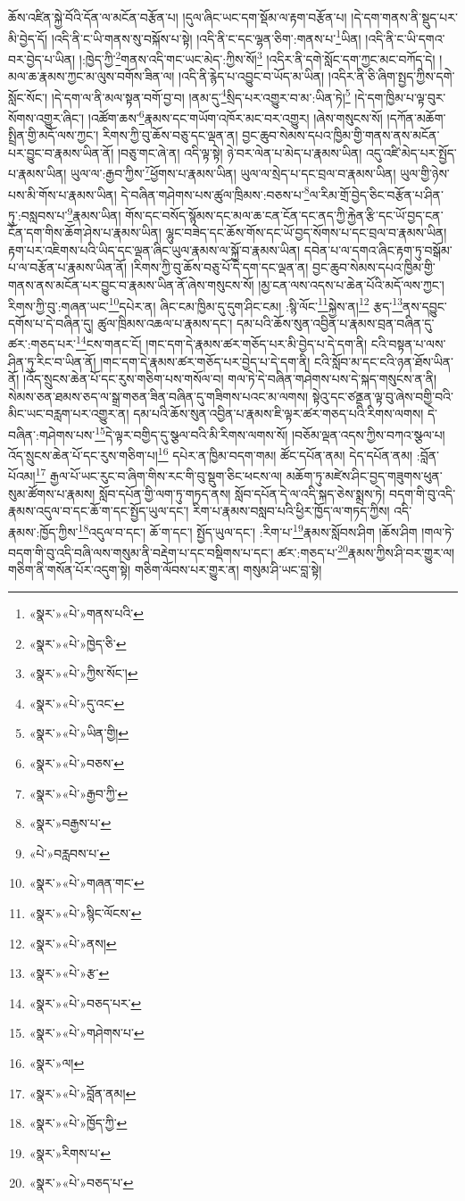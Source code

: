ཆོས་འཛིན་སྐྱེ་བོའི་དོན་ལ་མངོན་བརྩོན་པ། །དུལ་ཞིང་ཡང་དག་སྡོམ་ལ་རྟག་བརྩོན་པ། །དེ་དག་གནས་ནི་སྡུད་པར་མི་བྱེད་དོ། །འདི་ནི་ང་ཡི་གནས་སུ་བསྐོས་པ་སྟེ། །འདི་ནི་ང་དང་ལྷན་ཅིག་:གནས་པ་\footnote{«སྣར་»«པེ་»གནས་པའི་}ཡིན། །འདི་ནི་ང་ཡི་དགའ་བར་བྱེད་པ་ཡིན། །:ཁྱེད་ཀྱི་\footnote{«སྣར་»«པེ་»ཁྱེད་ཅི་}གནས་འདི་གང་ཡང་མེད་:ཀྱིས་སོ།\footnote{«སྣར་»«པེ་»ཀྱིས་སོང་།} །འདིར་ནི་དགེ་སློང་དག་ཀྱང་མང་བཀོད་དེ། །མལ་ཆ་རྣམས་ཀྱང་མ་ལུས་བགོས་ཟིན་ལ། །འདི་ནི་རྙེད་པ་འབྱུང་བ་ཡོད་མ་ཡིན། །འདིར་ནི་ཅི་ཞིག་སྤྱད་ཀྱིས་དགེ་སློང་སོང་། །དེ་དག་ལ་ནི་མལ་སྟན་བགོ་བྱ་བ། །ནམ་དུ་\footnote{«སྣར་»«པེ་»དུ་འང་}སྲིད་པར་འགྱུར་བ་མ་:ཡིན་ཏེ།\footnote{«སྣར་»«པེ་»ཡིན་གྱི།} །དེ་དག་ཁྱིམ་པ་ལྟ་བུར་སོགས་འགྱུར་ཞིང་། །འཚོག་ཆས་\footnote{«སྣར་»«པེ་»བཅས་}རྣམས་དང་གཡོག་འཁོར་མང་བར་འགྱུར། །ཞེས་གསུངས་སོ། །དཀོན་མཆོག་སྤྲིན་གྱི་མདོ་ལས་ཀྱང་། རིགས་ཀྱི་བུ་ཆོས་བཅུ་དང་ལྡན་ན། བྱང་ཆུབ་སེམས་དཔའ་ཁྱིམ་གྱི་གནས་ནས་མངོན་པར་བྱུང་བ་རྣམས་ཡིན་ནོ། །བཅུ་གང་ཞེ་ན། འདི་ལྟ་སྟེ། ཉེ་བར་ལེན་པ་མེད་པ་རྣམས་ཡིན། འདུ་འཛི་མེད་པར་སྤྱོད་པ་རྣམས་ཡིན། ཡུལ་ལ་:རྒྱབ་ཀྱིས་\footnote{«སྣར་»«པེ་»རྒྱབ་ཀྱི་}ཕྱོགས་པ་རྣམས་ཡིན། ཡུལ་ལ་སྲེད་པ་དང་བྲལ་བ་རྣམས་ཡིན། ཡུལ་གྱི་ཉེས་པས་མི་གོས་པ་རྣམས་ཡིན། དེ་བཞིན་གཤེགས་པས་ཚུལ་ཁྲིམས་:བཅས་པ་\footnote{«སྣར་»བརྒྱས་པ་}ལ་རིམ་གྲོ་བྱེད་ཅིང་བརྩོན་པ་ཤིན་ཏུ་:བསླབས་པ་\footnote{«པེ་»བརླབས་པ་}རྣམས་ཡིན། གོས་དང་བསོད་སྙོམས་དང་མལ་ཆ་ངན་ངོན་དང་ནད་ཀྱི་རྐྱེན་རྩི་དང་ཡོ་བྱད་ངན་ངོན་དག་གིས་ཆོག་ཤེས་པ་རྣམས་ཡིན། ལྷུང་བཟེད་དང་ཆོས་གོས་དང་ཡོ་བྱད་སོགས་པ་དང་བྲལ་བ་རྣམས་ཡིན། རྟག་པར་འཇིགས་པའི་ཡིད་དང་ལྡན་ཞིང་ཡུལ་རྣམས་ལ་སྐྱོ་བ་རྣམས་ཡིན། དབེན་པ་ལ་དགའ་ཞིང་རྟག་ཏུ་བསྒོམ་པ་ལ་བརྩོན་པ་རྣམས་ཡིན་ནོ། །རིགས་ཀྱི་བུ་ཆོས་བཅུ་པོ་དེ་དག་དང་ལྡན་ན། བྱང་ཆུབ་སེམས་དཔའ་ཁྱིམ་གྱི་གནས་ནས་མངོན་པར་བྱུང་བ་རྣམས་ཡིན་ནོ་ཞེས་གསུངས་སོ། །མྱ་ངན་ལས་འདས་པ་ཆེན་པོའི་མདོ་ལས་ཀྱང་། རིགས་ཀྱི་བུ་:གཞན་ཡང་\footnote{«སྣར་»«པེ་»གཞན་གང་}དཔེར་ན། ཞིང་ངམ་ཁྱིམ་དུ་དུག་ཤིང་ངམ། :སྙི་ལོང་\footnote{«སྣར་»«པེ་»སྙིང་ལོངས་}སྐྱེས་ན།\footnote{«སྣར་»«པེ་»ནས།} རྩད་\footnote{«སྣར་»«པེ་»རྩ་}ནས་དབྱུང་དགོས་པ་དེ་བཞིན་དུ། ཚུལ་ཁྲིམས་འཆལ་པ་རྣམས་དང་། དམ་པའི་ཆོས་སུན་འབྱིན་པ་རྣམས་བྲན་བཞིན་དུ་ཚར་:གཅད་པར་\footnote{«སྣར་»«པེ་»བཅད་པར་}ངས་གནང་ངོ། །གང་དག་དེ་རྣམས་ཚར་གཅོད་པར་མི་བྱེད་པ་དེ་དག་ནི། ངའི་བསྟན་པ་ལས་ཤིན་ཏུ་རིང་བ་ཡིན་ནོ། །གང་དག་དེ་རྣམས་ཚར་གཅོད་པར་བྱེད་པ་དེ་དག་ནི། ངའི་སློབ་མ་དང་ངའི་ཉན་ཐོས་ཡིན་ནོ། །འོད་སྲུངས་ཆེན་པོ་དང་རུས་གཅིག་པས་གསོལ་བ། གལ་ཏེ་དེ་བཞིན་གཤེགས་པས་དེ་སྐད་གསུངས་ན་ནི། སེམས་ཅན་ཐམས་ཅད་ལ་སྒྲ་གཅན་ཟིན་བཞིན་དུ་གཟིགས་པའང་མ་ལགས། སྟེའུ་དང་ཙནྡན་ལྟ་བུ་ཞེས་བགྱི་བའི་མིང་ཡང་བརླག་པར་འགྱུར་ན། དམ་པའི་ཆོས་སུན་འབྱིན་པ་རྣམས་ཇི་ལྟར་ཚར་གཅད་པའི་རིགས་ལགས། དེ་བཞིན་:གཤེགས་པས་\footnote{«སྣར་»«པེ་»གཤེགས་པ་}དེ་ལྟར་བགྱིད་དུ་སྩལ་བའི་མི་རིགས་ལགས་སོ། །བཅོམ་ལྡན་འདས་ཀྱིས་བཀའ་སྩལ་པ། འོད་སྲུངས་ཆེན་པོ་དང་རུས་གཅིག་པ།\footnote{«སྣར་»ལ།} དཔེར་ན་ཁྱིམ་བདག་གམ། ཚོང་དཔོན་ནམ། དེད་དཔོན་ནམ། :བློན་པོའམ།\footnote{«སྣར་»«པེ་»བློན་ནམ།} རྒྱལ་པོ་ཡང་རུང་བ་ཞིག་གིས་རང་གི་བུ་སྡུག་ཅིང་ཕངས་ལ། མཆོག་ཏུ་མཛེས་ཤིང་བྱད་གཟུགས་ཕུན་སུམ་ཚོགས་པ་རྣམས། སློབ་དཔོན་གྱི་ལག་ཏུ་གཏད་ནས། སློབ་དཔོན་དེ་ལ་འདི་སྐད་ཅེས་སྨྲས་ཏེ། བདག་གི་བུ་འདི་རྣམས་འདུལ་བ་དང་ཆོ་ག་དང་སྤྱོད་ཡུལ་དང་། རིག་པ་རྣམས་བསླབ་པའི་ཕྱིར་ཁྱོད་ལ་གཏད་ཀྱིས། འདི་རྣམས་:ཁྱོད་ཀྱིས་\footnote{«སྣར་»«པེ་»ཁྱོད་ཀྱི་}འདུལ་བ་དང་། ཆོ་ག་དང་། སྤྱོད་ཡུལ་དང་། :རིག་པ་\footnote{«སྣར་»རིགས་པ་}རྣམས་སློབས་ཤིག །ཆོས་ཤིག །གལ་ཏེ་བདག་གི་བུ་འདི་བཞི་ལས་གསུམ་ནི་བརྡེག་པ་དང་བསྡིགས་པ་དང་། ཚར་:གཅད་པ་\footnote{«སྣར་»«པེ་»བཅད་པ་}རྣམས་ཀྱིས་ཤི་བར་གྱུར་ལ། གཅིག་ནི་གསོན་པོར་འདུག་སྟེ། གཅིག་ལོབས་པར་གྱུར་ན། གསུམ་ཤི་ཡང་བླ་སྟེ། 
